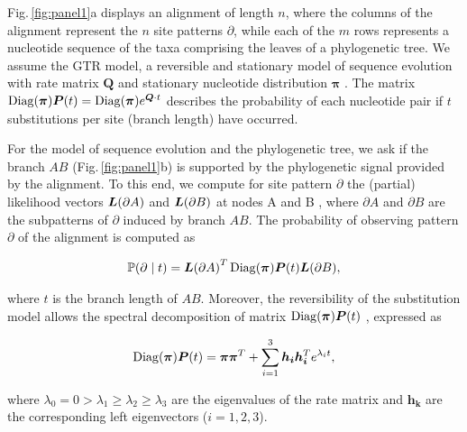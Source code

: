 \medskip

Fig.\,\ref{fig:panel1}a displays an alignment of length $n$, where the columns of the alignment represent the $n$ site patterns $\partial$, while each of the $m$ rows represents a nucleotide sequence of the taxa comprising the leaves of a phylogenetic tree. We assume the GTR model, a reversible and stationary model of sequence evolution   with rate matrix $\bm{Q}$  and stationary nucleotide distribution $\bm{\pi}$ . The matrix $\operatorname{Diag} (\bm{\pi})\bm{P}(t) = \operatorname{Diag} (\bm{\pi})e^{\bm{Q}\cdot t}$ describes the probability of each nucleotide pair if $t$ substitutions per site (branch length) have occurred.

\medskip

For the model of sequence evolution and the phylogenetic tree, we ask if the branch $AB$ (Fig.\,\ref{fig:panel1}b) is supported by the phylogenetic signal provided by the alignment. To this end, we compute for site pattern $\partial$ the (partial) likelihood vectors ${ \bm{L}(\partial A) }$ and ${ \bm{L}(\partial B) }$ at nodes A and B , where $\partial A$ and $\partial B$ are the subpatterns of $\partial$
induced by branch $AB$. The probability of observing pattern $\partial$ of the alignment is
computed as

\begin{align} \label{eq:branch_likelihood_given_t} \mathbb{P}(\partial \mid t)  = { \bm{L}(\partial A) }^T \operatorname{Diag} (\bm{\pi})  \bm{P}(t) { \bm{L}(\partial B) },
\end{align}

where $t$ is the branch length of $AB$. Moreover, the reversibility of the substitution model allows the spectral decomposition of matrix $\operatorname{Diag} (\bm{\pi})\bm{P}(t)$ , expressed as


\begin{align} \label{eq:spectral_decomposition}
   \operatorname{Diag} (\bm{\pi})\bm{P}(t) = \bm{\pi} \bm{\pi}^T + \sum_{i=1}^3\bm{h_i} \bm{h_i}^T e^{\lambda_it},
\end{align}
 
where  ${\lambda_0 = 0 > \lambda_1 \geq \lambda_2 \geq \lambda_3}$  are the eigenvalues of the rate matrix and $\bm{h_k}$  are the corresponding left eigenvectors ($i = 1,2,3$). 

